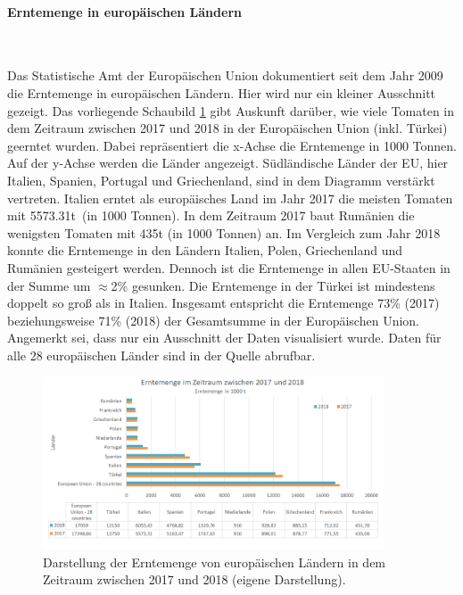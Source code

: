\paragraph{Erntemenge in europäischen Ländern}
~\newline

Das Statistische Amt der Europäischen Union dokumentiert seit dem Jahr 2009 die Erntemenge in europäischen Ländern\cite{eurostat}. Hier wird nur ein kleiner Ausschnitt gezeigt. Das vorliegende Schaubild \ref{erntemenge} gibt Auskunft darüber, wie viele Tomaten in dem Zeitraum zwischen 2017 und 2018 in der Europäischen Union (inkl. Türkei) geerntet wurden. Dabei repräsentiert die x-Achse die Erntemenge in 1000 Tonnen. Auf der y-Achse werden die Länder angezeigt. Südländische Länder der EU, hier Italien, Spanien, Portugal und Griechenland, sind in dem Diagramm verstärkt vertreten. Italien erntet als europäisches Land im Jahr 2017 die meisten Tomaten mit 5573.31t (in 1000 Tonnen). In dem Zeitraum 2017 baut Rumänien die wenigsten Tomaten mit 435t (in 1000 Tonnen) an. Im Vergleich zum Jahr 2018 konnte die Erntemenge in den Ländern Italien, Polen, Griechenland und Rumänien gesteigert werden. Dennoch ist die Erntemenge in allen EU-Staaten in der Summe um $\approx$2\% gesunken. Die Erntemenge in der Türkei ist mindestens doppelt so groß als in Italien. Insgesamt entspricht die Erntemenge 73\% (2017) beziehungsweise 71\% (2018) der Gesamtsumme in der Europäischen Union. Angemerkt sei, dass nur ein Ausschnitt der Daten visualisiert wurde. Daten für alle 28 europäischen Länder sind in der Quelle abrufbar\cite{eurostat}.
	

\begin{figure}[h!]
	\centering
	\includegraphics[width=0.9\textwidth]{bilder/erntemenge.PNG}
	\caption{Darstellung der Erntemenge\cite{eurostat} von europäischen Ländern in dem Zeitraum zwischen 2017 und 2018 (eigene Darstellung).}
	\label{erntemenge}
\end{figure}




